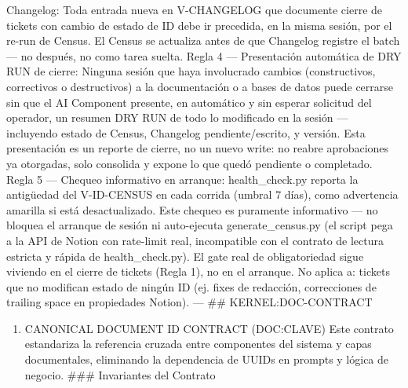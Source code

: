 \documentclass[
]{article}
\providecommand{\tightlist}{%
  \setlength{\itemsep}{0pt}\setlength{\parskip}{0pt}}
\begin{document}
\begin{itemize}
  Changelog: Toda entrada nueva en V-CHANGELOG que documente cierre de
  tickets con cambio de estado de ID debe ir precedida, en la misma
  sesión, por el re-run de Census. El Census se actualiza antes de que
  Changelog registre el batch --- no después, no como tarea suelta.
  Regla 4 --- Presentación automática de DRY RUN de cierre: Ninguna
  sesión que haya involucrado cambios (constructivos, correctivos o
  destructivos) a la documentación o a bases de datos puede cerrarse sin
  que el AI Component presente, en automático y sin esperar solicitud
  del operador, un resumen DRY RUN de todo lo modificado en la sesión
  --- incluyendo estado de Census, Changelog pendiente/escrito, y
  versión. Esta presentación es un reporte de cierre, no un nuevo write:
  no reabre aprobaciones ya otorgadas, solo consolida y expone lo que
  quedó pendiente o completado. Regla 5 --- Chequeo informativo en
  arranque: health\_check.py reporta la antigüedad del V-ID-CENSUS en
  cada corrida (umbral 7 días), como advertencia amarilla si está
  desactualizado. Este chequeo es puramente informativo --- no bloquea
  el arranque de sesión ni auto-ejecuta generate\_census.py (el script
  pega a la API de Notion con rate-limit real, incompatible con el
  contrato de lectura estricta y rápida de health\_check.py). El gate
  real de obligatoriedad sigue viviendo en el cierre de tickets (Regla
  1), no en el arranque. No aplica a: tickets que no modifican estado de
  ningún ID (ej. fixes de redacción, correcciones de trailing space en
  propiedades Notion). --- \#\# KERNEL:DOC-CONTRACT
\end{itemize}

\begin{enumerate}
\def\labelenumi{\arabic{enumi}.}
\tightlist
\item
  CANONICAL DOCUMENT ID CONTRACT (DOC:CLAVE) Este contrato estandariza
  la referencia cruzada entre componentes del sistema y capas
  documentales, eliminando la dependencia de UUIDs en prompts y lógica
  de negocio. \#\#\# Invariantes del Contrato
\end{enumerate}
\end{document}
